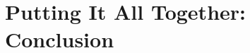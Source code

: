 \documentclass[../main]{subfiles}
\begin{document}
\chapter{Putting It All Together: Conclusion} \label{chp:}





\clearpage



\end{document}
